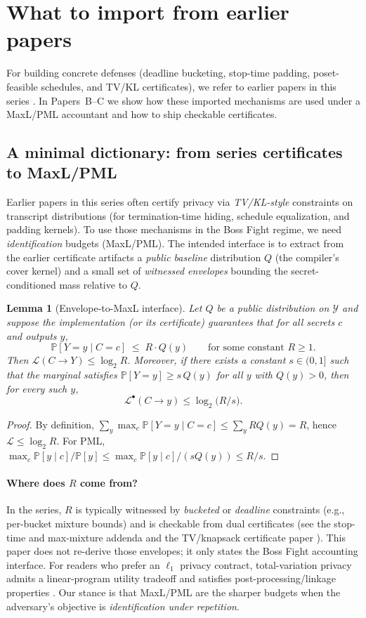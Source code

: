 \documentclass[11pt]{article}
\newcommand{\Prb}{\mathbb{P}}
\newcommand{\MaxL}{\mathcal{L}}
\newcommand{\PML}{\mathcal{L}^{\bullet}}
\newcommand{\logtwo}{\log_2}
\newcommand{\Y}{\mathcal{Y}} %
\newtheorem{lemma}{Lemma}
\begin{document}
\section{What to import from earlier papers}\label{sec:import}
For building concrete defenses (deadline bucketing, stop-time padding, poset-feasible schedules, and TV/KL certificates), we refer to earlier papers in this series
\cite{series:schedcompiler,series:knapsacktransport,series:prefixcapacities,series:stoptimeaddendum}.
In Papers~B--C we show how these imported mechanisms are used under a MaxL/PML accountant and how to ship checkable certificates.

\subsection{A minimal dictionary: from series certificates to MaxL/PML}
Earlier papers in this series often certify privacy via \emph{TV/KL-style} constraints on transcript distributions (for termination-time hiding, schedule equalization, and padding kernels).
To use those mechanisms in the Boss Fight regime, we need \emph{identification} budgets (MaxL/PML).
The intended interface is to extract from the earlier certificate artifacts a \emph{public baseline} distribution $Q$ (the compiler's cover kernel) and a small set of \emph{witnessed envelopes} bounding the secret-conditioned mass relative to $Q$.

\begin{lemma}[Envelope-to-MaxL interface]\label{lem:envelope}
Let $Q$ be a public distribution on $\Y$ and suppose the implementation (or its certificate) guarantees that for all secrets $c$ and outputs $y$,
\[
\Prb[Y=y\mid C=c]\;\le\; R\cdot Q(y)
\qquad\text{for some constant }R\ge 1.
\]
Then $\MaxL(C\to Y)\le \logtwo R$.
Moreover, if there exists a constant $s\in(0,1]$ such that the marginal satisfies $\Prb[Y=y]\ge s\,Q(y)$ for all $y$ with $Q(y)>0$, then for every such $y$,
\[
\PML(C\!\to\!y)\le \logtwo\!\big(R/s\big).
\]
\end{lemma}
\begin{proof}
By definition,
$\sum_y\max_c \Prb[Y=y\mid C=c]\le \sum_y RQ(y)=R$, hence $\MaxL\le\logtwo R$.
For PML, $\max_c \Prb[y\mid c]/\Prb[y]\le \max_c \Prb[y\mid c]/(sQ(y))\le R/s$.
\end{proof}


\paragraph{Where does $R$ come from?}
In the series, $R$ is typically witnessed by \emph{bucketed} or \emph{deadline} constraints (e.g., per-bucket mixture bounds) and is checkable from dual certificates (see the stop-time and max-mixture addenda \cite{series:stoptimeaddendum} and the TV/knapsack certificate paper \cite{series:knapsacktransport}).
This paper does not re-derive those envelopes; it only states the Boss Fight accounting interface.
For readers who prefer an $\ell_1$ privacy contract, total-variation privacy admits a linear-program utility tradeoff and satisfies post-processing/linkage properties \cite{rassouli2018tv}.
Our stance is that MaxL/PML are the sharper budgets when the adversary's objective is \emph{identification under repetition}.
\end{document}
